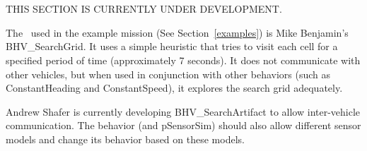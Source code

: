 \section{\bhvsg}
\label{bhvSearchGrid}
THIS SECTION IS CURRENTLY UNDER DEVELOPMENT.

The \bhvsg\ used in the example mission (See Section~\ref{examples}) is Mike Benjamin's BHV\_SearchGrid.  It uses a simple heuristic that tries to visit each cell for a specified period of time (approximately 7 seconds).  It does not communicate with other vehicles, but when used in conjunction with other behaviors (such as ConstantHeading and ConstantSpeed), it explores the search grid adequately.

Andrew Shafer is currently developing BHV\_SearchArtifact to allow inter-vehicle communication.  The behavior (and pSensorSim) should also allow different sensor models and change its behavior based on these models.
